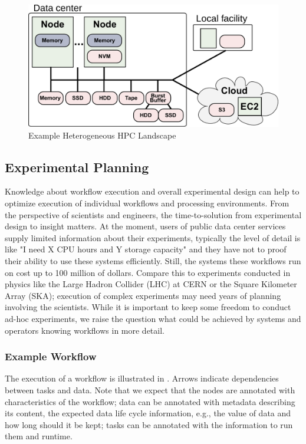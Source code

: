 \documentclass[a4paper, twocolumn]{article}
\begin{document}
\begin{figure}[b]
  \centering
  \includegraphics[width=\columnwidth]{system}
  \caption{Example Heterogeneous HPC Landscape}
  \label{fig:heterogeneous}
\end{figure}



\subsection{Experimental Planning}

Knowledge about workflow execution and overall experimental design can help to
optimize execution of individual workflows and processing environments.
From the perspective of scientists and engineers, the time-to-solution from experimental design to insight matters.
At the moment, users of public data center services supply limited information about their experiments, typically the level of detail is like "I need X CPU hours and Y storage capacity" and they have not to proof their ability to use these systems efficiently.
Still, the systems these workflows run on cost up to 100 million of dollars.
Compare this to experiments conducted in physics like the Large Hadron Collider (LHC) at CERN or the Square Kilometer Array (SKA); execution of complex experiments may need years of planning involving the scientists.
While it is important to keep some freedom to conduct ad-hoc experiments, we raise the question what could be achieved by systems and operators knowing workflows in more detail.

\subsubsection{Example Workflow}

The execution of a workflow is illustrated in .
Arrows indicate dependencies between tasks and data.
Note that we expect that the nodes are annotated with characteristics of the workflow;
data can be annotated with metadata describing its content, the expected data life cycle information, e.g., the value of data and how long should it be kept; tasks can be annotated with the information to run them and runtime.
\end{document}
